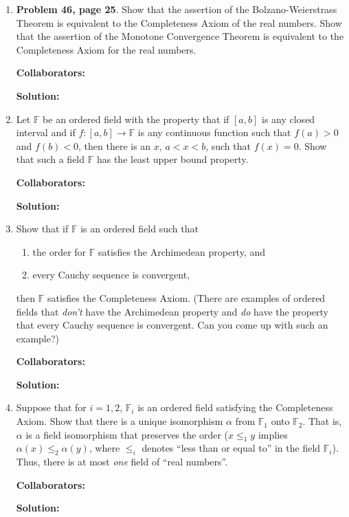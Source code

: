 \documentclass{article}%
\begin{document}
\begin{enumerate}
\item \textbf{Problem 46, page 25}. Show that the assertion of the Bolzano-Weierstrass Theorem is equivalent to the Completeness Axiom of the real numbers.  Show that the assertion of the Monotone Convergence Theorem is equivalent to the Completeness Axiom for the real numbers.


\bigskip
\textbf{Collaborators:}\\
\smallskip
 
\textbf{Solution:}
\bigskip



\item Let $\mathbb{F}$ be an ordered field with the property that if $[a,b]$ is any closed interval and if $f:[a,b]\rightarrow \mathbb{F}$ is any continuous function such that $f(a)>0$ and $f(b)<0$, then there is an $x$, $a < x < b$, such that $f(x)=0$.  Show that such a field $\mathbb{F}$ has the least upper bound property.


\bigskip
\textbf{Collaborators:}\\
\smallskip
 
\textbf{Solution:}
\bigskip


\item Show that if $\mathbb{F}$ is an ordered field such that
\begin{enumerate}
\item the order for $\mathbb{F}$ satisfies the Archimedean property, and
\item every Cauchy sequence is convergent, 
\end{enumerate}
then $\mathbb{F}$ satisfies the Completeness Axiom. (There are examples of ordered fields that \emph{don't} have the Archimedean property and \emph{do} have the property that every Cauchy sequence is convergent.  Can you come up with such an example?)


\bigskip
\textbf{Collaborators:}\\
\smallskip
 
\textbf{Solution:}
\bigskip


\item Suppose that for $i = 1,2$, $\mathbb{F}_i$ is an ordered field satisfying the Completeness Axiom. Show that there is a unique isomorphism $\alpha$ from $\mathbb{F}_1$ onto $\mathbb{F}_2$. That is, $\alpha$ is a field isomorphism that preserves the order ($x \leq_1 y$ implies $\alpha(x) \leq_2 \alpha(y)$, where $\leq_i$ denotes ``less than or equal to'' in the field $\mathbb{F}_i$). Thus, there is at most \emph{one} field of ``real numbers''. 


\bigskip
\textbf{Collaborators:}\\
\smallskip
 
\textbf{Solution:}
\bigskip


\end{enumerate}
\end{document}
